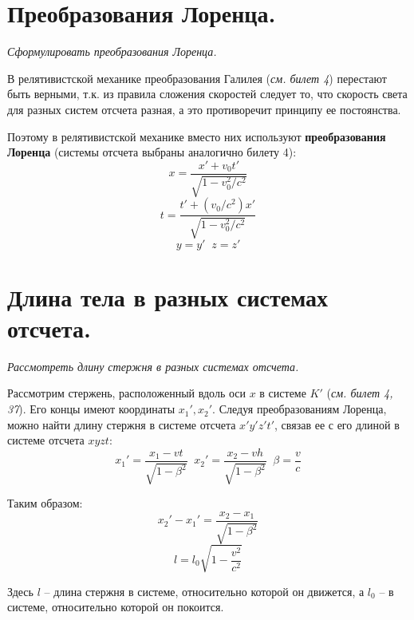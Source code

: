 \documentclass{article}
\begin{document}
    \section{Преобразования Лоренца.}
    \par
      \textit{Сформулировать преобразования Лоренца.}\\
    \par  
      В релятивистской механике преобразования Галилея (\textit{см. билет 4}) перестают быть верными, т.к. из правила сложения скоростей следует то, что скорость света для разных систем отсчета разная, а это противоречит принципу ее постоянства.
    \par
      Поэтому в релятивистской механике вместо них используют \textbf{преобразования Лоренца} (системы отсчета выбраны аналогично билету 4):
      \begin{equation}
	x=\frac{x'+v_0t'}{\sqrt{1-v_0^2/c^2}}
      \end{equation}
      \begin{equation}
	t=\frac{t'+(v_0/c^2)x'}{\sqrt{1-v_0^2/c^2}}
      \end{equation}
      \begin{equation}
	y=y'\;\;z=z'
      \end{equation}
  \clearpage
    
    \section{Длина тела в разных системах отсчета.}
    \par
      \textit{Рассмотреть длину стержня в разных системах отсчета.}\\
    \par       
      Рассмотрим стержень, расположенный вдоль оси $x$ в системе $K'$ (\textit{см. билет 4, 37}). Его концы имеют координаты $x_1', x_2'$. Следуя преобразованиям Лоренца, можно найти длину стержня в системе отсчета $x'y'z't'$, связав ее с его длиной в системе отсчета $xyzt$:
      \begin{equation}
	x_1'=\frac{x_1-vt}{\sqrt{1-\beta^2}}\;\;x_2'=\frac{x_2-vh}{\sqrt{1-\beta^2}}\;\;\beta=\frac{v}{c}
      \end{equation}
    \par
      Таким образом:
      \begin{equation}
	x_2'-x_1'=\frac{x_2-x_1}{\sqrt{1-\beta^2}}
      \end{equation}
      \begin{equation}
	l=l_0\sqrt{1-\frac{v^2}{c^2}}
      \end{equation}
    \par
      Здесь $l$ -- длина стержня в системе, относительно которой он движется, а $l_0$ -- в системе, относительно которой он покоится.
  \clearpage
    
\end{document}
